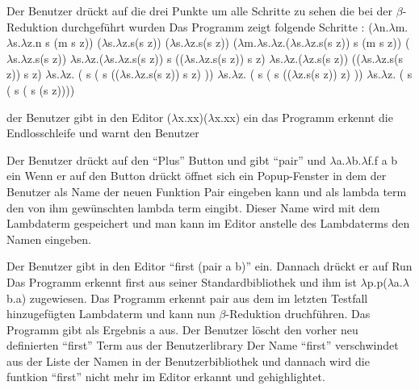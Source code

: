 \documentclass[parskip=full,11pt,twoside]{scrartcl}
\begin{document}
{ Der Benutzer drückt auf die drei Punkte um alle Schritte zu sehen die bei der $\beta$-Reduktion durchgeführt wurden }
{ Das Programm zeigt folgende Schritte :
\newline ($\lambda$n.$\lambda$m.$\lambda$s.$\lambda$z.n s (m s z)) ($\lambda$s.$\lambda$z.s(s z)) ($\lambda$s.$\lambda$z.s(s z))
\newline ($\lambda$m.$\lambda$s.$\lambda$z.($\lambda$s.$\lambda$z.s(s z)) s (m s z)) ($\lambda$s.$\lambda$z.s(s z))
\newline $\lambda$s.$\lambda$z.($\lambda$s.$\lambda$z.s(s z)) s (($\lambda$s.$\lambda$z.s(s z)) s z)
\newline $\lambda$s.$\lambda$z.($\lambda$z.s(s z)) (($\lambda$s.$\lambda$z.s(s z)) s z)
\newline $\lambda$s.$\lambda$z. ( s ( s (($\lambda$s.$\lambda$z.s(s z)) s z) ))
\newline $\lambda$s.$\lambda$z. ( s ( s (($\lambda$z.s(s z)) z) ))
\newline $\lambda$s.$\lambda$z. ( s ( s ( s (s z))))
 }

{der Benutzer gibt in den Editor ($\lambda$x.xx)($\lambda$x.xx) ein }
{ das Programm erkennt die Endlosschleife und warnt den Benutzer }

{ Der Benutzer drückt auf den \enquote {Plus} Button und gibt \enquote {pair} und $\lambda$a.$\lambda$b.$\lambda$f.f a b ein }
{Wenn er auf den Button drückt öffnet sich ein Popup-Fenster in dem der Benutzer als Name der neuen Funktion Pair eingeben kann und als lambda term den von ihm gewünschten lambda term eingibt. Dieser Name wird mit dem Lambdaterm gespeichert und man kann im Editor anstelle des Lambdaterms den Namen eingeben. }

{ Der Benutzer gibt in den Editor \enquote {first (pair a b)} ein. Dannach drückt er auf Run}
{ Das Programm erkennt first aus seiner Standardbibliothek und ihm ist $\lambda$p.p($\lambda$a.$\lambda$b.a) zugewiesen. Das Programm erkennt pair aus dem im letzten Testfall hinzugefügten Lambdaterm und kann nun $\beta$-Reduktion druchführen. Das Programm gibt als Ergebnis a aus.}
{Der Benutzer löscht den vorher neu definierten \enquote{first} Term aus der Benutzerlibrary}
{Der Name \enquote{first} verschwindet aus der Liste der Namen in der Benutzerbibliothek und dannach wird die funtkion \enquote{first} nicht mehr im Editor erkannt und gehighlightet.}
\end{document}
